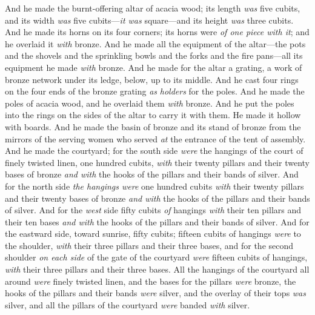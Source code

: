 \begin{biblechapter} %
 And he made the burnt-offering altar of acacia wood; its length \textit{was} five cubits, and its width \textit{was} five cubits—\textit{it was} square—and its height \textit{was} three cubits.
\verse And he made its horns on its four corners; its horns were \textit{of one piece with it}; and he overlaid it \textit{with} bronze.
\verse And he made all the equipment of the altar—the pots and the shovels and the sprinkling bowls and the forks and the fire pans—all its equipment he made \textit{with} bronze.
\verse And he made for the altar a grating, a work of bronze network under its ledge, below, up to its middle.
\verse And he cast four rings on the four ends of the bronze grating \textit{as} \textit{holders} for the poles.
\verse And he made the poles of acacia wood, and he overlaid them \textit{with} bronze.
\verse And he put the poles into the rings on the sides of the altar to carry it with them. He made it hollow with boards.
\verse And he made the basin of bronze and its stand of bronze from the mirrors of the serving women who served \textit{at} the entrance of the tent of assembly.
 And he made the courtyard; for the south side \textit{were} the hangings of the court of finely twisted linen, one hundred cubits,
\verse \textit{with} their twenty pillars and their twenty bases of bronze \textit{and with} the hooks of the pillars and their bands of silver.
\verse And for the north side \textit{the hangings were} one hundred cubits \textit{with} their twenty pillars and their twenty bases of bronze \textit{and with} the hooks of the pillars and their bands of silver.
\verse And for the \textit{west} side fifty cubits \textit{of} hangings \textit{with} their ten pillars and their ten bases \textit{and with} the hooks of the pillars and their bands of silver.
\verse And for the eastward side, toward sunrise, fifty cubits;
\verse fifteen cubits of hangings \textit{were} to the shoulder, \textit{with} their three pillars and their three bases,
\verse and for the second shoulder \textit{on each side} of the gate of the courtyard \textit{were} fifteen cubits of hangings, \textit{with} their three pillars and their three bases.
\verse All the hangings of the courtyard all around \textit{were} finely twisted linen,
\verse and the bases for the pillars \textit{were} bronze, the hooks of the pillars and their bands \textit{were} silver, and the overlay of their tops \textit{was} silver, and all the pillars of the courtyard \textit{were} banded \textit{with} silver.

\end{biblechapter}
